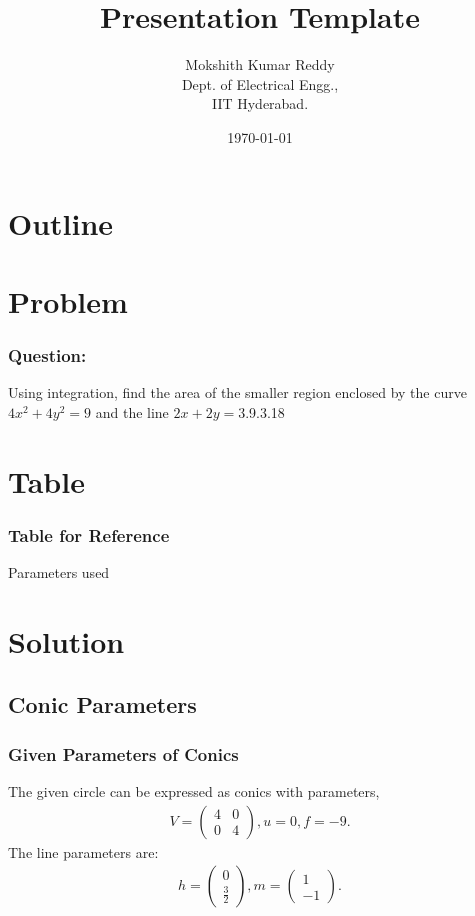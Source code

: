 \documentclass{beamer}
\title{Presentation Template}
\author{Mokshith Kumar Reddy \\ Dept. of Electrical Engg.,\\IIT Hyderabad.}
\date{\today}
\theoremstyle{remark}
\newcommand{\myvec}[1]{\ensuremath{\begin{pmatrix}#1\end{pmatrix}}}
\begin{document}
\begin{frame}
\titlepage
\end{frame}

\section*{Outline}
\section{Problem}
\begin{frame}
\frametitle{Question: }
    Using integration, find the area of the smaller region enclosed by the curve $4x^2 + 4y^2 = 9$ and the line $2x + 2y = 3$.\hfill{9.3.18}
\end{frame}
\section{Table}
\begin{frame}
\frametitle{Table for Reference}
\begin{table}[h]
    \centering
    
    \caption{Parameters used}
    \label{}
\end{table}
\end{frame}
\section{Solution}
\subsection{Conic Parameters}
\begin{frame}
\frametitle{Given Parameters of Conics}
The given circle can be expressed as conics with parameters,
\begin{align}
    V=\myvec{4 & 0\\0 & 4}, u=0, f=-9.
\end{align}
The line parameters are:
\begin{align}
    h=\myvec{0\\ \frac{3}{2}}, m=\myvec{1\\-1}.
\end{align}
\end{frame}
\end{document}
